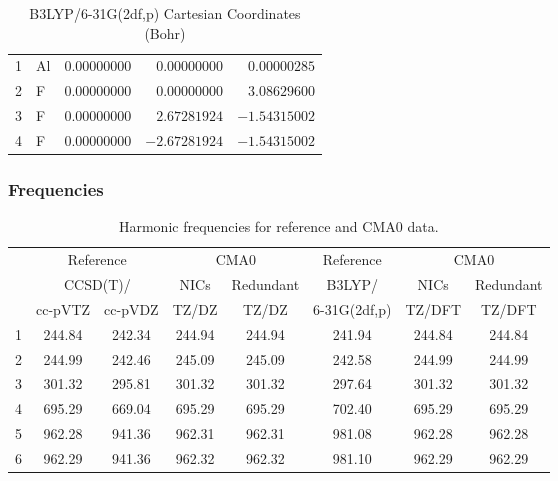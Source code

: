 \documentclass[10pt,oneside]{article}
\begin{document}
\begin{table}[h]
\centering
\caption{B3LYP/6-31G(2df,p) Cartesian Coordinates (Bohr)}
\begin{tabular}{llrrr}
\toprule
1  & Al & $ 0.00000000$ & $ 0.00000000$ & $ 0.00000285$ \\
2  & F  & $ 0.00000000$ & $ 0.00000000$ & $ 3.08629600$ \\
3  & F  & $ 0.00000000$ & $ 2.67281924$ & $-1.54315002$ \\
4  & F  & $ 0.00000000$ & $-2.67281924$ & $-1.54315002$ \\
\bottomrule
\end{tabular}
\end{table}

\begin{table}[h!]
\subsubsection*{Frequencies}
\centering
\caption{Harmonic frequencies for reference and CMA0 data.}
\begin{tabular}{cccccccc}
\toprule
{} & \multicolumn{2}{c}{Reference} & \multicolumn{2}{c}{CMA0} &    Reference & \multicolumn{2}{c}{CMA0} \\
{} & \multicolumn{2}{c}{CCSD(T)/} &   NICs &  Redundant &       B3LYP/ &   NICs & Redundant \\
{} &   cc-pVTZ & cc-pVDZ &  TZ/DZ &      TZ/DZ & 6-31G(2df,p) & TZ/DFT &    TZ/DFT \\
\midrule
1 &    244.84 &  242.34 & 244.94 &     244.94 &       241.94 & 244.84 &    244.84 \\
2 &    244.99 &  242.46 & 245.09 &     245.09 &       242.58 & 244.99 &    244.99 \\
3 &    301.32 &  295.81 & 301.32 &     301.32 &       297.64 & 301.32 &    301.32 \\
4 &    695.29 &  669.04 & 695.29 &     695.29 &       702.40 & 695.29 &    695.29 \\
5 &    962.28 &  941.36 & 962.31 &     962.31 &       981.08 & 962.28 &    962.28 \\
6 &    962.29 &  941.36 & 962.32 &     962.32 &       981.10 & 962.29 &    962.29 \\
\bottomrule
\end{tabular}
\end{table}
\end{document}
